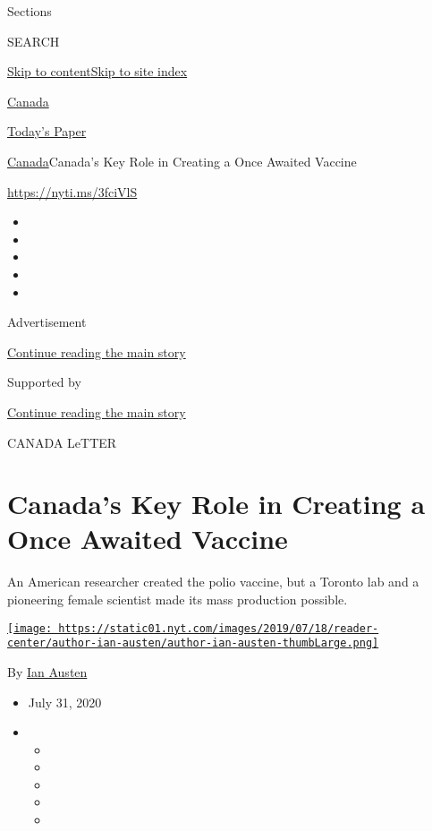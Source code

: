 Sections

SEARCH

\protect\hyperlink{site-content}{Skip to
content}\protect\hyperlink{site-index}{Skip to site index}

\href{https://www.nytimes.com/section/world/canada}{Canada}

\href{https://myaccount.nytimes.com/auth/login?response_type=cookie\&client_id=vi}{}

\href{https://www.nytimes.com/section/todayspaper}{Today's Paper}

\href{/section/world/canada}{Canada}\textbar{}Canada's Key Role in
Creating a Once Awaited Vaccine

\url{https://nyti.ms/3fciVlS}

\begin{itemize}
\item
\item
\item
\item
\item
\end{itemize}

Advertisement

\protect\hyperlink{after-top}{Continue reading the main story}

Supported by

\protect\hyperlink{after-sponsor}{Continue reading the main story}

CANADA LeTTER

\hypertarget{canadas-key-role-in-creating-a-once-awaited-vaccine}{%
\section{Canada's Key Role in Creating a Once Awaited
Vaccine}\label{canadas-key-role-in-creating-a-once-awaited-vaccine}}

An American researcher created the polio vaccine, but a Toronto lab and
a pioneering female scientist made its mass production possible.

\href{https://www.nytimes.com/by/ian-austen}{\texttt{[image: https://static01.nyt.com/images/2019/07/18/reader-center/author-ian-austen/author-ian-austen-thumbLarge.png]}}

By \href{https://www.nytimes.com/by/ian-austen}{Ian Austen}

\begin{itemize}
\item
  July 31, 2020
\item
  \begin{itemize}
  \item
  \item
  \item
  \item
  \item
  \end{itemize}
\end{itemize}

